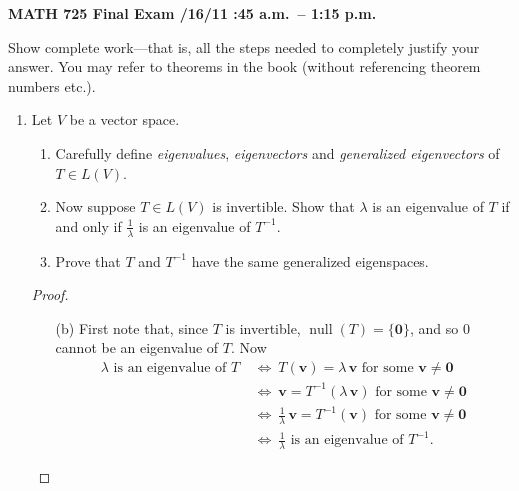 \documentclass[12pt]{amsart}
\def\0{\mathbf 0}
\def\v{\mathbf v}
\renewcommand\null{\operatorname{null}}
\begin{document}
\setlength{\parindent}{0pt}
\setlength{\parskip}{0.4cm}

\pagestyle{empty} 

\begin{center} {\bf MATH 725 \qquad Final Exam /16/11 :45 a.m.\ -- 1:15 p.m. } \end{center} 

Show complete work---that is, all the steps needed to completely justify your answer. %
You may refer to theorems in the book (without referencing theorem numbers etc.).
\thispagestyle{empty}

\begin{enumerate} 

\item Let $V$ be a vector space.
  \begin{enumerate} 
  \item Carefully define \emph{eigenvalues}, \emph{eigenvectors} and \emph{generalized eigenvectors} of $T \in L(V)$.
  \item Now suppose $T \in L(V)$ is invertible. Show that $\lambda$ is an eigenvalue of $T$ if and only if $\frac 1 \lambda$ is an eigenvalue of $T^{ -1 }$.
  \item Prove that $T$ and $T^{ -1 }$ have the same generalized eigenspaces.
  \end{enumerate}

\begin{proof}
\begin{enumerate} 

\item[(b)] First note that, since $T$ is invertible, $\null(T) = \{ \0 \}$, and so $0$ cannot be an eigenvalue of $T$. Now
\begin{align*}
  \lambda \text{ is an eigenvalue of } T
  &\ \Longleftrightarrow \ T(\v) = \lambda \, \v \text{ for some } \v \ne \0 \\
  &\ \Longleftrightarrow \ \v = T^{ -1 } (\lambda \, \v) \text{ for some } \v \ne \0 \\
  &\ \Longleftrightarrow \ \tfrac 1 \lambda \, \v = T^{ -1 } (\v) \text{ for some } \v \ne \0 \\
  &\ \Longleftrightarrow \ \tfrac 1 \lambda \text{ is an eigenvalue of } T^{ -1 } .
\end{align*}


\end{enumerate}
\end{proof}
\end{enumerate}
\end{document}
